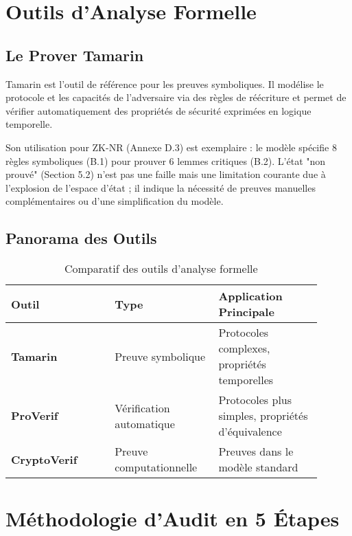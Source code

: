 \section{Outils d'Analyse Formelle}
\label{sec:18.2}

\subsection{Le Prover Tamarin}
\label{subsec:18.2.1}

Tamarin est l'outil de référence pour les preuves symboliques. Il modélise le protocole et les capacités de l'adversaire via des règles de réécriture et permet de vérifier automatiquement des propriétés de sécurité exprimées en logique temporelle.

Son utilisation pour ZK-NR (Annexe D.3) est exemplaire : le modèle spécifie 8 règles symboliques (B.1) pour prouver 6 lemmes critiques (B.2). L'état "non prouvé" (Section 5.2) n'est pas une faille mais une limitation courante due à l'explosion de l'espace d'état ; il indique la nécessité de preuves manuelles complémentaires ou d'une simplification du modèle.

\subsection{Panorama des Outils}
\label{subsec:18.2.2}

\begin{table}[H]
\centering
\caption{Comparatif des outils d'analyse formelle}
\label{tab:18.1}
\begin{tabular}{|p{0.3\linewidth}|p{0.3\linewidth}|p{0.3\linewidth}|}
\hline
\textbf{Outil} & \textbf{Type} & \textbf{Application Principale} \\
\hline
\hline
\textbf{Tamarin} & Preuve symbolique & Protocoles complexes, propriétés temporelles \\
\hline
\textbf{ProVerif} & Vérification automatique & Protocoles plus simples, propriétés d'équivalence \\
\hline
\textbf{CryptoVerif} & Preuve computationnelle & Preuves dans le modèle standard \\
\hline
\end{tabular}
\end{table}

\section{Méthodologie d'Audit en 5 Étapes}
\label{sec:18.3}

